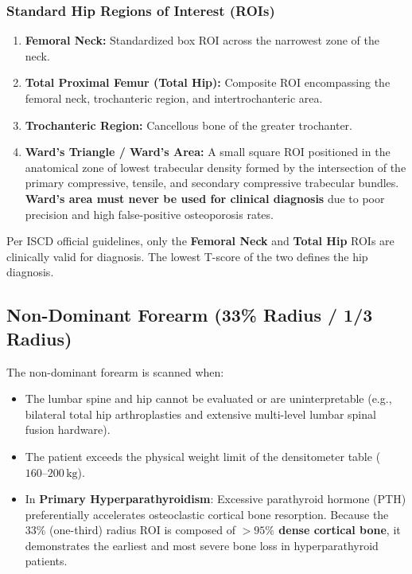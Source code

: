 \documentclass[11pt,a4paper]{article}
\begin{document}
\subsubsection{Standard Hip Regions of Interest (ROIs)}
\begin{enumerate}[leftmargin=*]
    \item \textbf{Femoral Neck:} Standardized box ROI across the narrowest zone of the neck.
    \item \textbf{Total Proximal Femur (Total Hip):} Composite ROI encompassing the femoral neck, trochanteric region, and intertrochanteric area.
    \item \textbf{Trochanteric Region:} Cancellous bone of the greater trochanter.
    \item \textbf{Ward's Triangle / Ward's Area:} A small square ROI positioned in the anatomical zone of lowest trabecular density formed by the intersection of the primary compressive, tensile, and secondary compressive trabecular bundles. \textbf{Ward's area must never be used for clinical diagnosis} due to poor precision and high false-positive osteoporosis rates.
\end{enumerate}
Per ISCD official guidelines, only the \textbf{Femoral Neck} and \textbf{Total Hip} ROIs are clinically valid for diagnosis. The lowest T-score of the two defines the hip diagnosis.

\subsection{Non-Dominant Forearm (33\% Radius / 1/3 Radius)}

The non-dominant forearm is scanned when:
\begin{itemize}[leftmargin=*]
    \item The lumbar spine and hip cannot be evaluated or are uninterpretable (e.g., bilateral total hip arthroplasties and extensive multi-level lumbar spinal fusion hardware).
    \item The patient exceeds the physical weight limit of the densitometer table ($160\text{--}200\,\text{kg}$).
    \item In \textbf{Primary Hyperparathyroidism}: Excessive parathyroid hormone (PTH) preferentially accelerates osteoclastic cortical bone resorption. Because the 33\% (one-third) radius ROI is composed of \textbf{$> 95\%$ dense cortical bone}, it demonstrates the earliest and most severe bone loss in hyperparathyroid patients.
\end{itemize}
\end{document}
